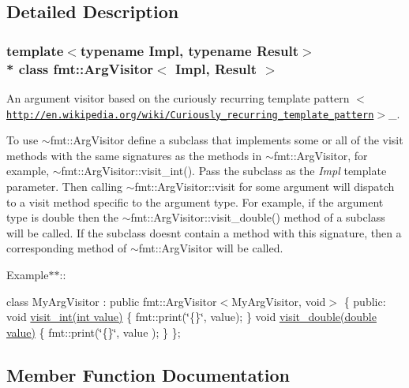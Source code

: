 \subsection{Detailed Description}
\subsubsection*{template$<$typename Impl, typename Result$>$\\*
class fmt\+::\+Arg\+Visitor$<$ Impl, Result $>$}

An argument visitor based on the {\ttfamily curiously recurring template pattern $<$\href{http://en.wikipedia.org/wiki/Curiously_recurring_template_pattern}{\tt http\+://en.\+wikipedia.\+org/wiki/\+Curiously\+\_\+recurring\+\_\+template\+\_\+pattern}$>$}\+\_\+.

To use {\ttfamily $\sim$fmt\+::\+Arg\+Visitor} define a subclass that implements some or all of the visit methods with the same signatures as the methods in {\ttfamily $\sim$fmt\+::\+Arg\+Visitor}, for example, {\ttfamily $\sim$fmt\+::\+Arg\+Visitor\+::visit\+\_\+int()}. Pass the subclass as the {\itshape Impl} template parameter. Then calling {\ttfamily $\sim$fmt\+::\+Arg\+Visitor\+::visit} for some argument will dispatch to a visit method specific to the argument type. For example, if the argument type is {\ttfamily double} then the {\ttfamily $\sim$fmt\+::\+Arg\+Visitor\+::visit\+\_\+double()} method of a subclass will be called. If the subclass doesn\textquotesingle{}t contain a method with this signature, then a corresponding method of {\ttfamily $\sim$fmt\+::\+Arg\+Visitor} will be called.

Example$\ast$$\ast$\+:\+:

class My\+Arg\+Visitor \+: public fmt\+::\+Arg\+Visitor$<$\+My\+Arg\+Visitor, void$>$ \{ public\+: void \hyperlink{classfmt_1_1ArgVisitor_ac6d79e3d931a9f56f40bca08f8651cdf}{visit\+\_\+int(int value)} \{ fmt\+::print(\char`\"{}\{\}\char`\"{}, value); \} void \hyperlink{classfmt_1_1ArgVisitor_a2a7a4cbb1df7a8b3c310a607600773ae}{visit\+\_\+double(double value)} \{ fmt\+::print(\char`\"{}\{\}\char`\"{}, value ); \} \};  

\subsection{Member Function Documentation}

